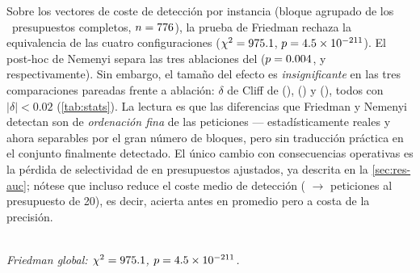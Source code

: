 Sobre los vectores de coste de detección por instancia (bloque agrupado de los
\NumBloquesCompletos{}~presupuestos completos, $n = \ValorFriedmanN{}$), la
prueba de Friedman rechaza la equivalencia de las cuatro configuraciones
($\chi^2 = \num{975.1}{}$, $p = \num{4.5e-211}{}$). El post-hoc de
Nemenyi separa las tres ablaciones del 
($p = \num{0.004}{}$, \ValorNemenyiNoPriority{} y
\ValorNemenyiNoRuntimeConfirm{} respectivamente). Sin embargo, el tamaño del
efecto es \emph{insignificante} en las tres comparaciones pareadas
 frente a ablación: $\delta$ de Cliff de
\ValorCliffNoInterleave{} (), \ValorCliffNoPriority{}
() y \ValorCliffNoRuntimeConfirm{}
(), todos con $\lvert\delta\rvert < \num{0.02}$
(\cref{tab:stats}). La lectura es que las diferencias que Friedman y Nemenyi
detectan son de \emph{ordenación fina} de las peticiones --- estadísticamente
reales y ahora separables por el gran número de bloques, pero sin traducción
práctica en el conjunto finalmente detectado. El único cambio con
consecuencias operativas es la pérdida de selectividad de 
en presupuestos ajustados, ya descrita en la \cref{sec:res-auc}; nótese que
 incluso reduce el coste medio de detección
(\ValorCosteBaseline{} $\to$ \ValorCosteNoPriority{} peticiones al presupuesto
de \num{20}), es decir, acierta antes en promedio pero a costa de la
precisión.

\begin{table}[t]
  \centering
  \caption{Pruebas sobre el coste de detección por instancia, 
  frente a cada ablación (bloque agrupado, $n = \ValorFriedmanN{}$). Wilcoxon
  con corrección de Benjamini--Hochberg; $p_{\text{Nem.}}$ del post-hoc de
  Nemenyi; $\delta$ de Cliff como tamaño del efecto. Fuente:
  .}
  \label{tab:stats}
  \footnotesize
  \setlength{\tabcolsep}{4pt}
  \\[2pt]
  \footnotesize\emph{Friedman global: $\chi^2 = \num{975.1}{}$,
  $p = \num{4.5e-211}{}$.}
\end{table}


